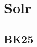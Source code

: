 \documentclass[11pt]{article}
\begin{document}
    \section{Solr}

    \subsection{BK25}




    
\end{document}
